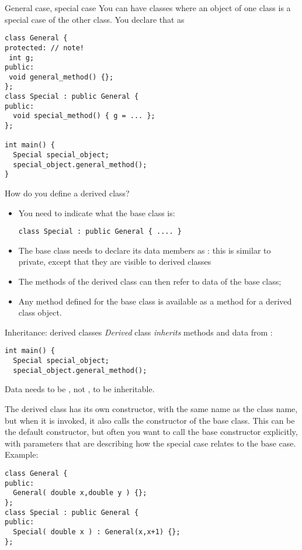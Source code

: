 \begin{slide}{General case, special case}
  \label{sl:obj-case}
  You can have classes where an object of one class is a special case of
  the other class. You declare that as
\begin{verbatim}
class General {
protected: // note!
 int g;
public:
 void general_method() {};
};
class Special : public General {
public:
  void special_method() { g = ... };
};

int main() {
  Special special_object;
  special_object.general_method();
}
\end{verbatim}
\end{slide}

How do you define a derived class?
\begin{itemize}
\item You need to indicate what the base class is:
\begin{verbatim}
class Special : public General { .... }
\end{verbatim}
\item The base class needs to declare its data members as
  : this is similar to private, except that
  they are visible to derived classes
\item The methods of the derived class can then refer to data of the
  base class;
\item Any method defined for the base class is available as a method
  for a derived class object.
\end{itemize}

\begin{slide}{Inheritance: derived classes}
  \label{sl:obj-derive}
  \emph{Derived} class 
  \emph{inherits} methods and data from
   :
\begin{verbatim}
int main() {
  Special special_object;
  special_object.general_method();
\end{verbatim}
Data needs to be , not , to be inheritable.
\end{slide}

The derived class has its own constructor, with the same name as the
class name, but when it is invoked, it also calls the constructor of
the base class. This can be the default constructor, but often you
want to call the base constructor explicitly, with parameters that are
describing how the special case relates to the base case. Example:
\begin{verbatim}
class General {
public:
  General( double x,double y ) {};
};
class Special : public General {
public:
  Special( double x ) : General(x,x+1) {};
};
\end{verbatim}


